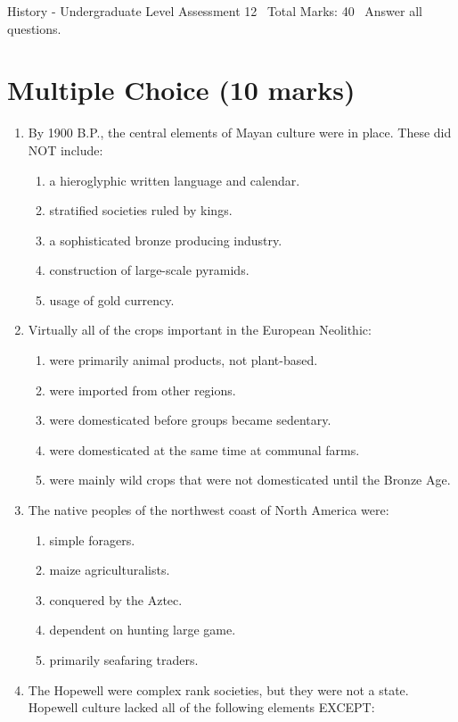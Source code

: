 \documentclass[12pt]{article}
\begin{document}
\begin{center}
History - Undergraduate Level Assessment 12 \
Total Marks: 40 \
Answer all questions.
\end{center}

\section*{Multiple Choice (10 marks)}
\begin{enumerate}[label=\arabic*.]
\item By 1900 B.P., the central elements of Mayan culture were in place. These did NOT include:
\begin{enumerate}[label=(\alph*)]
    \item a hieroglyphic written language and calendar.
    \item stratified societies ruled by kings.
    \item a sophisticated bronze producing industry.
    \item construction of large-scale pyramids.
    \item usage of gold currency.
\end{enumerate}
\item Virtually all of the crops important in the European Neolithic:
\begin{enumerate}[label=(\alph*)]
    \item were primarily animal products, not plant-based.
    \item were imported from other regions.
    \item were domesticated before groups became sedentary.
    \item were domesticated at the same time at communal farms.
    \item were mainly wild crops that were not domesticated until the Bronze Age.
\end{enumerate}
\item The native peoples of the northwest coast of North America were:
\begin{enumerate}[label=(\alph*)]
    \item simple foragers.
    \item maize agriculturalists.
    \item conquered by the Aztec.
    \item dependent on hunting large game.
    \item primarily seafaring traders.
\end{enumerate}
\item The Hopewell were complex rank societies, but they were not a state. Hopewell culture lacked all of the following elements EXCEPT:

\end{enumerate}
\end{document}
